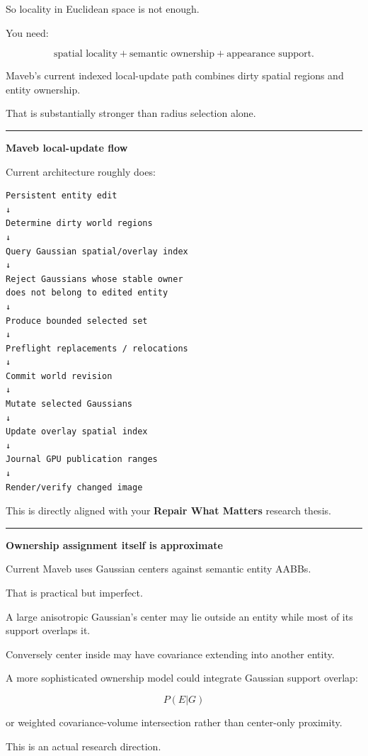 So locality in Euclidean space is not enough.

You need:

\[
\boxed{
\text{spatial locality}
+
\text{semantic ownership}
+
\text{appearance support}
}.
\]

Maveb's current indexed local-update path combines dirty spatial regions and entity ownership.

That is substantially stronger than radius selection alone.

\begin{center}\rule{0.5\linewidth}{0.5pt}\end{center}

\textbf{Maveb local-update flow}

Current architecture roughly does:

\protect{}\label{ia3d5k}%
\begin{verbatim}
Persistent entity edit
↓
Determine dirty world regions
↓
Query Gaussian spatial/overlay index
↓
Reject Gaussians whose stable owner
does not belong to edited entity
↓
Produce bounded selected set
↓
Preflight replacements / relocations
↓
Commit world revision
↓
Mutate selected Gaussians
↓
Update overlay spatial index
↓
Journal GPU publication ranges
↓
Render/verify changed image
\end{verbatim}

This is directly aligned with your \textbf{Repair What Matters} research thesis.

\begin{center}\rule{0.5\linewidth}{0.5pt}\end{center}

\textbf{Ownership assignment itself is approximate}

Current Maveb uses Gaussian centers against semantic entity AABBs.

That is practical but imperfect.

A large anisotropic Gaussian's center may lie outside an entity while most of its support overlaps it.

Conversely center inside may have covariance extending into another entity.

A more sophisticated ownership model could integrate Gaussian support overlap:

\[
P(E|G)
\]

or weighted covariance-volume intersection rather than center-only proximity.

This is an actual research direction.

